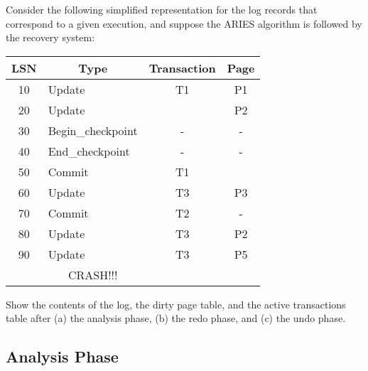 {\color{gray}Consider the following simplified representation for the log records that correspond to a given execution, and suppose the ARIES algorithm is followed by the recovery system:}
\begin{table}[H]
\centering

{\color{gray}
\begin{tabular}{|c|l|c|c|}
\hline
\textbf{LSN}           & \multicolumn{1}{c|}{\textbf{Type}} & \textbf{Transaction}  & \textbf{Page}         \\ \hline
10                     & Update                             & T1                    & P1                    \\ \hline
20                     & Update                             &                       & P2                    \\ \hline
30                     & Begin\_checkpoint                  & -                     & -                     \\ \hline
40                     & End\_checkpoint                    & -                     & -                     \\ \hline
50                     & Commit                             & T1                    &                       \\ \hline
60                     & Update                             & T3                    & P3                    \\ \hline
70                     & Commit                             & T2                    & -                     \\ \hline
80                     & Update                             & T3                    & P2                    \\ \hline
90                     & Update                             & T3                    & P5                    \\ \hline
\multicolumn{1}{|l|}{} & \multicolumn{1}{c|}{CRASH!!!}      & \multicolumn{1}{l|}{} & \multicolumn{1}{l|}{} \\ \hline
\end{tabular}
}
\end{table}

{\color{gray}Show the contents of the log, the dirty page table, and the active transactions table after (a) the analysis phase, (b) the redo phase, and (c) the undo phase.}

\subsection{Analysis Phase}

